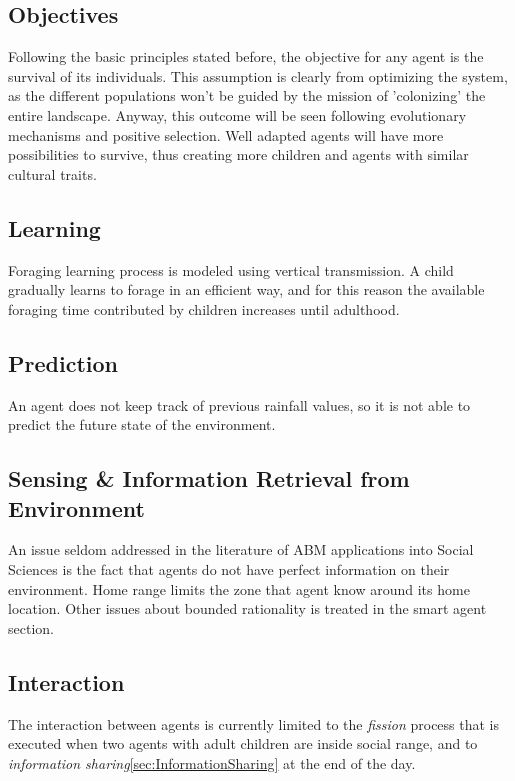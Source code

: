 \documentclass[11pt,oneside,a4paper,openright]{report}
\begin{document}
\subsection{Objectives}
Following the basic principles stated before, the objective for any agent is the survival of its individuals.
This assumption is clearly from optimizing the system, as the different populations won't be guided by
the mission of 'colonizing' the entire landscape. Anyway, this outcome will be seen following
evolutionary mechanisms and positive selection. Well adapted agents will have more possibilities to
survive, thus creating more children and agents with similar cultural traits.

\subsection{Learning}
Foraging learning process is modeled using vertical transmission. A child gradually learns to forage in
an efficient way, and for this reason the available foraging time contributed by children increases until
adulthood.
\subsection{Prediction}
An agent does not keep track of previous rainfall values, so it is not able to predict the future state of
the environment.
\subsection{Sensing \& Information Retrieval from Environment}
An issue seldom addressed in the literature of ABM applications into Social Sciences is the fact that
agents do not have perfect information on their environment. Home range limits the zone that agent
know around its home location. Other issues about bounded rationality is treated in the smart agent section.
 
\subsection{Interaction}
The interaction between agents is currently limited to the \emph{fission} process that is executed when two
agents with adult children are inside social range, and to \emph{information sharing}\ref{sec:InformationSharing} at the end of the day.
\end{document}

